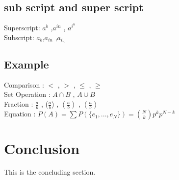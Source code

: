 \documentclass[18pt,a4paper]{article}
\begin{document}
\subsection{sub script and super script}
Superscript: $a^b$ ,$a^{in}$ , $a^{i^n}$ \\
Subscript: $a_b$,$a_{in}$ ,$a_{i_n}$
\subsection{Example}
Comparison : $<$ , $>$ , $\leq$ , $\geq$ \\ 
Set Operation : $A \cap B$ , $A \cup B $ \\
Fraction : $\frac{a}{b}$ , ($\frac{a}{b}$) , $(\frac{a}{b})$ , $\left(\frac{a}{b}\right)$\\
Equation : $P(A) = \sum P\left( \{e_1,...,e_N \} \right) =  \binom{N}{k} p^k p^{N-k} $
\printbibliography

\section{Conclusion}
This is the concluding section.
\end{document}
